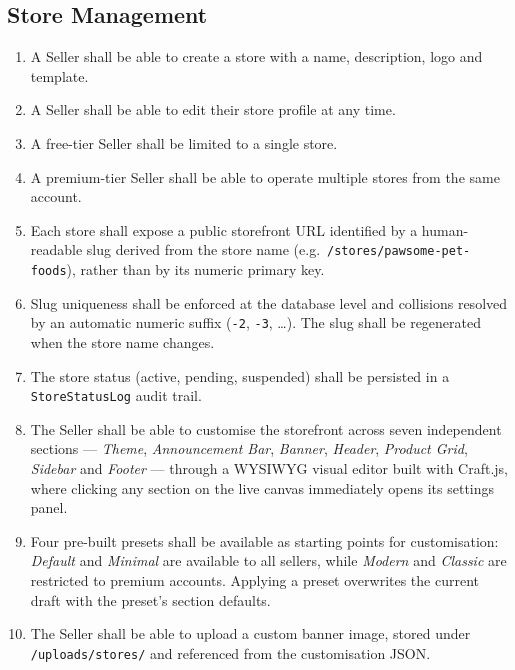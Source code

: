 \documentclass[12pt, a4paper, oneside]{report}
\begin{document}
\subsection{Store Management}

\begin{enumerate}[label=\textbf{FR-S\arabic*.},leftmargin=*,itemsep=2pt]
  \item A Seller shall be able to create a store with a name,
        description, logo and template.
  \item A Seller shall be able to edit their store profile at any
        time.
  \item A free-tier Seller shall be limited to a single store.
  \item A premium-tier Seller shall be able to operate multiple
        stores from the same account.
  \item Each store shall expose a public storefront URL identified
        by a human-readable slug derived from the store name (e.g.\
        \texttt{/stores/pawsome-pet-foods}), rather than by its
        numeric primary key.
  \item Slug uniqueness shall be enforced at the database level and
        collisions resolved by an automatic numeric suffix
        (\texttt{-2}, \texttt{-3}, \ldots). The slug shall be
        regenerated when the store name changes.
  \item The store status (active, pending, suspended) shall be
        persisted in a \texttt{StoreStatusLog} audit trail.
  \item The Seller shall be able to customise the storefront across
        seven independent sections --- \textit{Theme},
        \textit{Announcement Bar}, \textit{Banner}, \textit{Header},
        \textit{Product Grid}, \textit{Sidebar} and \textit{Footer}
        --- through a WYSIWYG visual editor built with
        Craft.js, where clicking any section on the live canvas
        immediately opens its settings panel.
  \item Four pre-built presets shall be available as starting points
        for customisation: \textit{Default} and \textit{Minimal} are
        available to all sellers, while \textit{Modern} and
        \textit{Classic} are restricted to premium accounts. Applying
        a preset overwrites the current draft with the preset's
        section defaults.
  \item The Seller shall be able to upload a custom banner image,
        stored under \texttt{/uploads/stores/} and referenced from
        the customisation JSON.

\end{enumerate}
\end{document}

